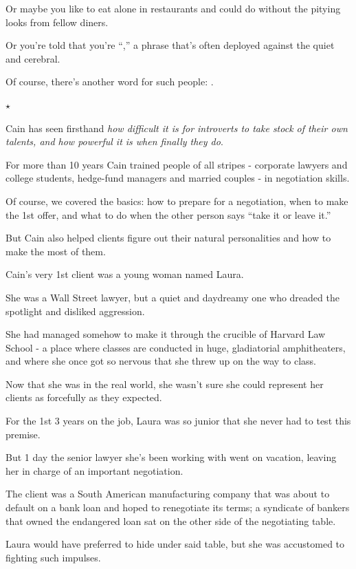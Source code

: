 \documentclass[oneside]{article}
\numberwithin{equation}{section}
\begin{document}
Or maybe you like to eat alone in restaurants and could do without the pitying looks from fellow diners.

Or you're told that you're ``,'' a phrase that's often deployed against the quiet and cerebral.

%
Of course, there's another word for such people: .
\begin{center}
    $\star$
\end{center}
Cain has seen firsthand \textit{how difficult it is for introverts to take stock of their own talents, and how powerful it is when finally they do}.

For more than 10 years Cain trained people of all stripes - corporate lawyers and college students, hedge-fund managers and married couples - in negotiation skills.

Of course, we covered the basics: how to prepare for a negotiation, when to make the 1st offer, and what to do when the other person says ``take it or leave it.''

But Cain also helped clients figure out their natural personalities and how to make the most of them.

%
Cain's very 1st client was a young woman named Laura.

She was a Wall Street lawyer, but a quiet and daydreamy one who dreaded the spotlight and disliked aggression.

She had managed somehow to make it through the crucible of Harvard Law School - a place where classes are conducted in huge, gladiatorial amphitheaters, and where she once got so nervous that she threw up on the way to class.

Now that she was in the real world, she wasn't sure she could represent her clients as forcefully as they expected.

%
For the 1st 3 years on the job, Laura was so junior that she never had to test this premise.

But 1 day the senior lawyer she's been working with went on vacation, leaving her in charge of an important negotiation.

The client was a South American manufacturing company that was about to default on a bank loan and hoped to renegotiate its terms; a syndicate of bankers that owned the endangered loan sat on the other side of the negotiating table.

%
Laura would have preferred to hide under said table, but she was accustomed to fighting such impulses.
\end{document}
